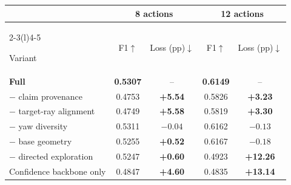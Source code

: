 \begin{tabular*}{\columnwidth}{@{\extracolsep{\fill}}lcccc@{}}
  \toprule
  & \multicolumn{2}{c}{8 actions}
  & \multicolumn{2}{c}{12 actions} \\
  \cmidrule(lr){2-3}\cmidrule(l){4-5}

  Variant
  & F1$\uparrow$ & Loss (pp)$\downarrow$
  & F1$\uparrow$ & Loss (pp)$\downarrow$ \\
  \midrule

  \textbf{Full \method{}}
  & \textbf{0.5307} & --
  & \textbf{0.6149} & -- \\

  $-$ claim provenance
  & 0.4753 & \textbf{+5.54}
  & 0.5826 & \textbf{+3.23} \\

  $-$ target-ray alignment
  & 0.4749 & \textbf{+5.58}
  & 0.5819 & \textbf{+3.30} \\

  $-$ yaw diversity
  & 0.5311 & $-0.04$
  & 0.6162 & $-0.13$ \\

  $-$ base geometry
  & 0.5255 & \textbf{+0.52}
  & 0.6167 & $-0.18$ \\

  $-$ directed exploration
  & 0.5247 & \textbf{+0.60}
  & 0.4923 & \textbf{+12.26} \\

  \addlinespace[2pt]
  Confidence backbone only
  & 0.4847 & \textbf{+4.60}
  & 0.4835 & \textbf{+13.14} \\

  \bottomrule
\end{tabular*}